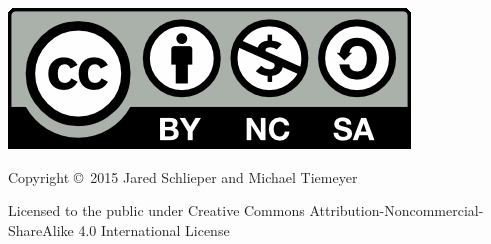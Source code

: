 \thispagestyle{plain}
\begin{fullwidth}
\begin{minipage}{2in}
\includegraphics[scale=.5]{figs/cc_license.png} 
\end{minipage}
\begin{minipage}{3.75in}
\noindent Copyright \copyright\ 2015 Jared Schlieper and Michael Tiemeyer

Licensed to the public under Creative Commons Attribution-Noncommercial-ShareAlike 4.0 International License
\end{minipage}
\end{fullwidth}


\newpage